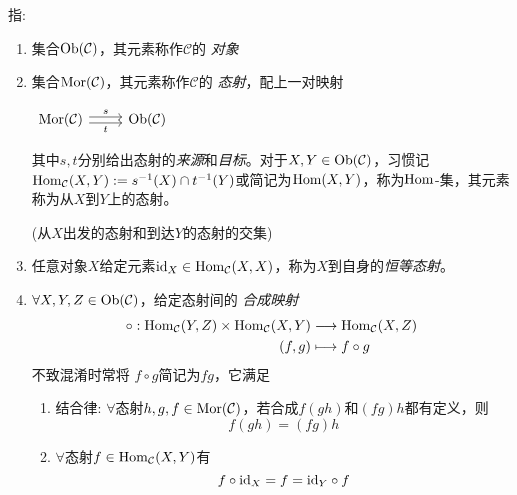 \begin{Def}[范畴$\mathcal{C}$]指:

    \begin{enumerate}
        \item 集合$\operatorname{Ob}(\mathcal{C})$，其元素称作$\mathcal{C}$的 \emph{对象}
        \item 集合$\operatorname{Mor}({\mathcal{C}})$，其元素称作$\mathcal{C}$的 \emph{态射}，配上一对映射
        \begin{center}
            $\begin{tikzcd} \Mor(\mathcal{C}) \arrow[yshift=-0.5ex, r, "t"'] \arrow[yshift=0.5ex, r, "s"] & \Obj(\mathcal{C}) \end{tikzcd}$
        \end{center}
        其中$s,t$分别给出态射的\emph{来源}和\emph{目标}。对于$X,Y\in \operatorname{Ob}(\mathcal{C})$，习惯记 $\operatorname{Hom}_{\mathcal{C}}(X,Y):=s^{-1}(X)\cap t^{-1}(Y)$或简记为$\operatorname{Hom}(X,Y)$，称为$\operatorname{Hom}$-集，其元素称为从$X$到$Y$上的态射。
        
        (从$X$出发的态射和到达$Y$的态射的交集)

        \item 任意对象$X$给定元素$\mathrm{id}_X\in \operatorname{Hom}_{\mathcal{C}}(X,X)$，称为$X$到自身的\emph{恒等态射}。
        \item $\forall X,Y,Z \in \operatorname{Ob}(\mathcal{C})$，给定态射间的 \emph{合成映射}
        \begin{align*}
            \circ: \operatorname{Hom}_{\mathcal{C}}(Y,Z)\times \operatorname{Hom}_{\mathcal{C}}(X,Y) &\longrightarrow \operatorname{Hom}_{\mathcal{C}}(X,Z) \\
            (f,g) & \longmapsto f\circ g  \\
        \end{align*}
        不致混淆时常将 $f \circ g$简记为$fg$，它满足
        \begin{enumerate}
            \item 结合律: $\forall $态射$h,g,f\in \operatorname{Mor}(\mathcal{C})$，若合成$f(gh)$和$(fg)h$都有定义，则
            \[f(gh)=(fg)h\]
            \item $\forall $态射$f\in \operatorname{Hom}_{\mathcal{C}}(X,Y)$有
            \[
                f\circ \mathrm{id}_X=f=\mathrm{id}_Y \circ f
            \]
        \end{enumerate}
    \end{enumerate}
\end{Def}
